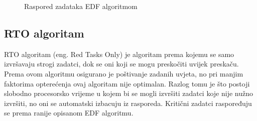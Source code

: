 \documentclass[../zavrsni.tex]{subfiles}
\begin{document}
\begin{figure}[h]
    \centering

    \begin{RTGrid}[width=13cm]{3}{24}

  

  

  

    \end{RTGrid}

    \caption{Raspored zadataka EDF algoritmom}
    \label{fig:ex1}
  \end{figure}

\subsection{RTO algoritam}

RTO algoritam (eng. Red Tasks Only) je algoritam prema kojemu se samo izvršavaju strogi zadatci, 
dok se oni koji se mogu preskočiti uvijek preskaču. Prema ovom algoritmu osigurano je poštivanje zadanih uvjeta, no pri manjim 
faktorima opterećenja ovaj algoritam nije optimalan. Razlog tomu je što postoji slobodno procesorsko vrijeme u kojem bi se mogli 
izvršiti zadatci koje nije nužno izvršiti, no oni se automatski izbacuju iz rasporeda. Kritični zadatci raspoređuju se prema 
ranije opisanom EDF algoritmu. 
\end{document}
